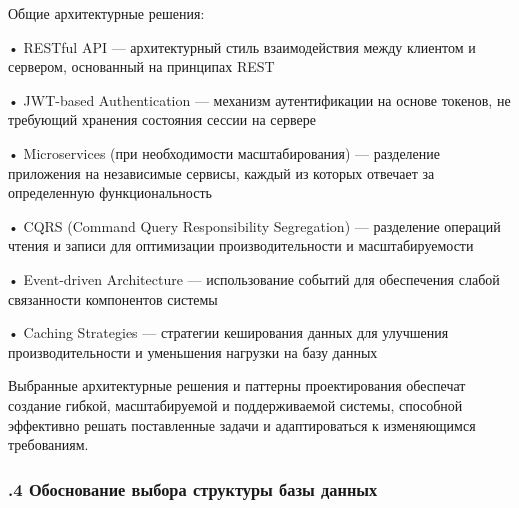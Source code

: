 {  \par \redline Общие архитектурные решения:

  \par \redline • RESTful API — архитектурный стиль взаимодействия между клиентом и сервером, основанный на принципах REST
  \par \redline • JWT-based Authentication — механизм аутентификации на основе токенов, не требующий хранения состояния сессии на сервере
  \par \redline • Microservices (при необходимости масштабирования) — разделение приложения на независимые сервисы, каждый из которых отвечает за определенную функциональность
  \par \redline • CQRS (Command Query Responsibility Segregation) — разделение операций чтения и записи для оптимизации производительности и масштабируемости
  \par \redline • Event-driven Architecture — использование событий для обеспечения слабой связанности компонентов системы
  \par \redline • Caching Strategies — стратегии кеширования данных для улучшения производительности и уменьшения нагрузки на базу данных

  \par \redline Выбранные архитектурные решения и паттерны проектирования обеспечат создание гибкой, масштабируемой и поддерживаемой системы, способной эффективно решать поставленные задачи и адаптироваться к изменяющимся требованиям.

  \par
}

\subtitlespace

\subsubsection*{ 
  \gostTitleFont
  .4 Обоснование выбора структуры базы данных
} 

\subtitlespace

